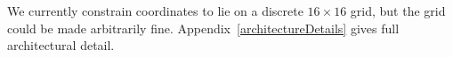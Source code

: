 \documentclass{article}
\newcommand{\remark}[1]{\textcolor{red}{[#1]}}
\theoremstyle{definition}
\begin{document}
We currently constrain
coordinates to lie on a discrete $16\times 16$ grid,
but the grid could be made arbitrarily fine. Appendix~\ref{architectureDetails} gives full architectural detail.  %
\end{document}
